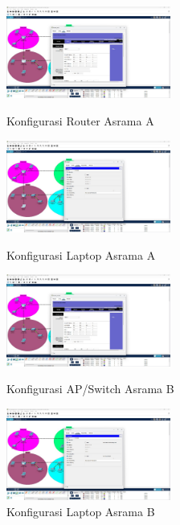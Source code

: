 \begin{figure}[h!]
    \centering
    \begin{minipage}{0.48\textwidth}
        \centering
        \includegraphics[width=0.48\textwidth]{img/ASA_R.jpeg}
        \caption*{Konfigurasi Router Asrama A}
        \label{fig:cfg_router_asrama_a}
    \end{minipage}\hfill
    \begin{minipage}{0.48\textwidth}
        \centering
        \includegraphics[width=0.48\textwidth]{img/ASA_L.jpeg}
        \caption*{Konfigurasi Laptop Asrama A}
        \label{fig:cfg_laptop_asrama_a}
    \end{minipage}
    \vspace{1em} 
    \begin{minipage}{0.48\textwidth}
        \centering
        \includegraphics[width=0.48\textwidth]{img/ASB_R.jpeg}
        \caption*{Konfigurasi AP/Switch Asrama B}
        \label{fig:cfg_router_asrama_b}
    \end{minipage}\hfill
    \begin{minipage}{0.48\textwidth}
        \centering
        \includegraphics[width=0.48\textwidth]{img/ASB_L.jpeg}
        \caption*{Konfigurasi Laptop Asrama B}
        \label{fig:cfg_laptop_asrama_b}
    \end{minipage}
\end{figure}

